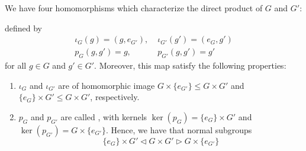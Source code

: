 \documentclass[12pt, a4paper, oneside, openright, titlepage]{book}
\begin{document}
\begin{rmk}
        We have four homomorphisms which characterize the direct product of $G$ and $G'$:
        \begin{center}
        \end{center}
        defined by \begin{align}
                \iota_G(g) = (g,e_{G'}),&\;\iota_{G'}(g') = (e_G,g') \\
                p_G(g,g') = g,&\;p_{G'}(g,g') = g'
        \end{align}
        for all $g \in G$ and $g' \in G'$. Moreover, this map satisfy the following properties: \begin{enumerate}
                \item $\iota_G$ and $\iota_{G'}$ are  of homomorphic image $G \times \{e_{G'}\} \leq G\times G'$ and $\{e_G\}\times G' \leq G\times G'$, respectively.
                \item $p_G$ and $p_{G'}$ are  called , with kernels $\ker(p_G) = \{e_G\}\times G'$ and $\ker(p_{G'}) = G\times \{e_{G'}\}$. Hence, we have that normal subgroups \begin{equation}
                                \{e_G\}\times G' \vartriangleleft G \times G' \vartriangleright G\times \{e_{G'}\}
                \end{equation}
        \end{enumerate}
\end{rmk}
\end{document}
